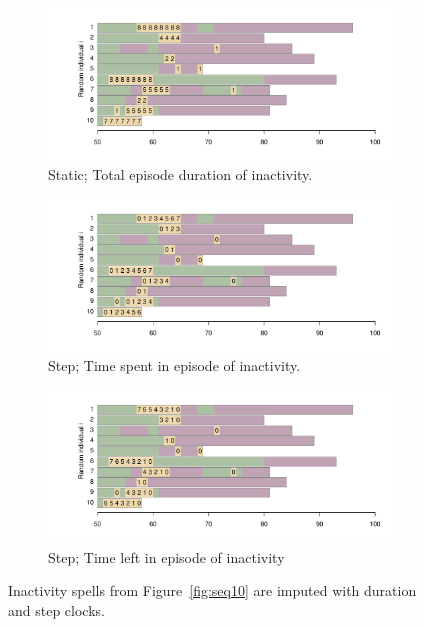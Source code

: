 \documentclass[a4paper,left=1.25cm,right=1.25cm,top=1.25cm,bottom=1.25cm]{article}
\begin{document}
\begin{figure}[ht!]
\centering

\begin{subfigure}{\textwidth}
\includegraphics[scale=.5]{Figures/Seq10dur.pdf}
\caption{Static; Total episode duration of inactivity.}
\label{fig:seq10dur}
\end{subfigure}

\begin{subfigure}{\textwidth}
\includegraphics[scale=.5]{Figures/Seq10timespent.pdf}
\caption{Step; Time spent in episode of inactivity.}
\label{fig:seq10timespent}
\end{subfigure}

\begin{subfigure}{\textwidth}
\includegraphics[scale=.5]{Figures/Seq10timeleft.pdf}
\caption{Step; Time left in episode of inactivity}
\label{fig:seq10timeleft}
\end{subfigure}
\caption{Inactivity spells from Figure~\ref{fig:seq10}
are imputed with duration and step clocks.}
\label{fig:spentleft}
\end{figure}
\end{document}
